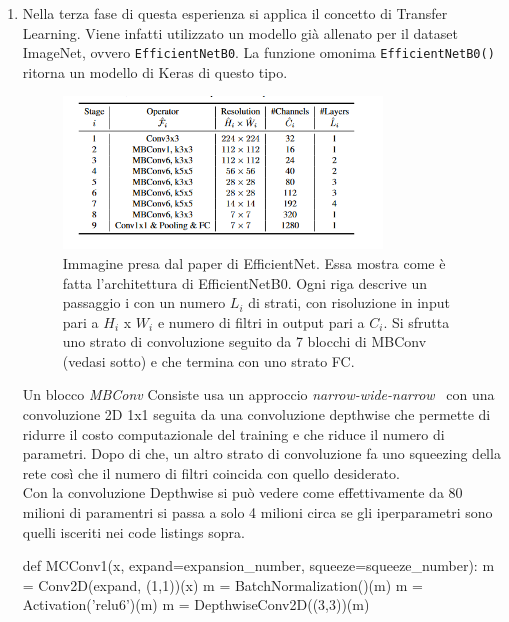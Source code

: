 \begin{enumerate}
    \item Nella terza fase di questa esperienza si applica il concetto di Transfer Learning.
     Viene infatti utilizzato un modello già allenato per il dataset ImageNet, ovvero \lstinline{EfficientNetB0}. 
    La funzione omonima \lstinline{EfficientNetB0()} ritorna un modello di Keras di questo tipo. \\
    \begin{figure}[H]
      \centering
      \includegraphics[width=0.8\textwidth]{Figures/EfficientNet.png}
      \caption{\small{Immagine presa dal paper di EfficientNet. Essa mostra come è fatta l'architettura di EfficientNetB0. Ogni riga descrive un passaggio i con un numero 
      \emph{$L_i$} di strati, con risoluzione in input pari a $H_i$ x $W_i$ e numero di filtri in output pari a $C_i$.
      Si sfrutta uno strato di convoluzione seguito da 7 blocchi di MBConv (vedasi sotto) 
       e che termina con uno strato FC.
      } %
      } %
      \label{fi:dcalc}
    \end{figure}
    
    
    Un blocco \emph{MBConv} Consiste usa un approccio \emph{narrow-wide-narrow}~\cite{mobilenet} con una convoluzione 2D 1x1 seguita da una
    convoluzione depthwise che permette di ridurre il costo computazionale del training e che riduce il
     numero di parametri. Dopo di che, un altro strato di convoluzione fa uno squeezing della rete così che il numero
     di filtri coincida con quello desiderato.\\
     Con la convoluzione Depthwise si può vedere come effettivamente da 80 milioni di paramentri si passa a solo 4 milioni circa se gli iperparametri sono quelli isceriti nei code listings sopra. 
    \begin{python}
  def MCConv1(x, expand=expansion_number, squeeze=squeeze_number):
  m = Conv2D(expand, (1,1))(x)
  m = BatchNormalization()(m)
  m = Activation('relu6')(m)
  m = DepthwiseConv2D((3,3))(m)
\end{python}


\end{enumerate}
